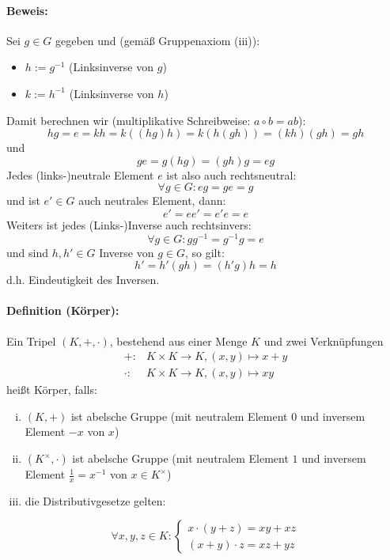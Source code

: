\documentclass[12pt,a4paper,parskip=half-,DIV=15]{scrartcl}
\begin{document}
\paragraph{Beweis:} Sei $g\in G$ gegeben und (gemäß Gruppenaxiom (iii)):
\begin{itemize}
\item $h:= g^{-1}$ (Linksinverse von $g$)
\item $k:= h^{-1}$ (Linksinverse von $h$)
\end{itemize}
Damit berechnen wir (multiplikative Schreibweise: $a\circ b = ab$):
\begin{equation*}
hg = e = kh = k((hg)h) = k(h(gh)) = (kh)(gh) = gh
\end{equation*}
und
\begin{equation*}
ge = g(hg) = (gh)g = eg
\end{equation*}
Jedes (links-)neutrale Element $e$ ist also auch rechtsneutral:
\begin{equation*}
\forall g\in G: eg = ge = g
\end{equation*}
und ist $e'\in G$ auch neutrales Element, dann:
\begin{equation*}
e' = ee' = e'e = e
\end{equation*}
Weiters ist jedes (Links-)Inverse auch rechtsinvers:
\begin{equation*}
\forall g \in G: gg^{-1}=g^{-1}g = e
\end{equation*}
und sind $h,h'\in G$ Inverse von $g\in G$, so gilt:
\begin{equation*}
h' = h'(gh) = (h'g)h = h
\end{equation*}
d.h. Eindeutigkeit des Inversen.

\paragraph{Definition (Körper):} Ein Tripel $(K,+,\cdot)$, bestehend aus einer Menge $K$ und zwei Verknüpfungen
\begin{align*}
+:&K\times K\to K,(x,y)\mapsto x+y\\
\cdot : &K\times K\to K, (x,y)\mapsto xy
\end{align*}
heißt Körper, falls:
\begin{enumerate}[(i)]
\item $(K,+)$ ist abelsche Gruppe (mit neutralem Element $0$ und inversem Element $-x$ von $x$)
\item $(K^\times,\cdot)$ ist abelsche Gruppe (mit neutralem Element $1$ und inversem Element $\frac{1}{x} = x^{-1}$ von $x\in K^\times$)
\item die Distributivgesetze gelten:
\end{enumerate}
\begin{equation*}
\forall x,y,z\in K :\begin{cases}x\cdot (y+z) = xy+xz\\ (x+y)\cdot z = xz+yz \end{cases}
\end{equation*}
\end{document}
